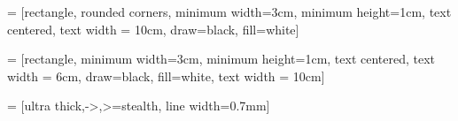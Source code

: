 \documentclass{Thesis}
\begin{document}


\usepackage{tikz}
\usetikzlibrary{shapes.geometric, arrows}

 = [rectangle, rounded corners, minimum width=3cm, minimum height=1cm, text centered, text width = 10cm, draw=black, fill=white]



 = [rectangle, minimum width=3cm, minimum height=1cm, text centered, text width = 6cm, draw=black, fill=white, text width = 10cm]


 = [ultra thick,->,>=stealth, line width=0.7mm]







\usepackage[T1]{fontenc}
\end{document}
